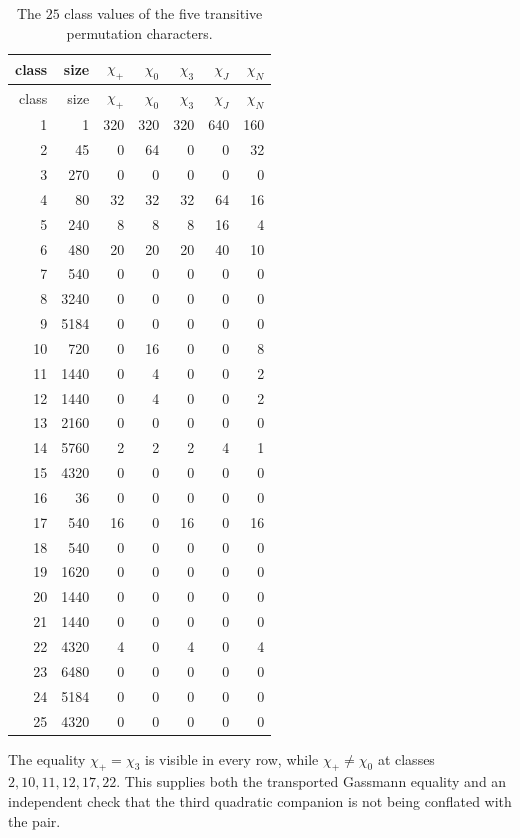 \begin{longtable}{@{}rrrrrrr@{}}
\caption{The $25$ class values of the five transitive permutation
characters.}
\label{tab:character-vectors}\\
\toprule
class & size & $\chi_+$ & $\chi_0$ & $\chi_3$ & $\chi_J$ & $\chi_N$\\
\midrule
\endfirsthead
\toprule
class & size & $\chi_+$ & $\chi_0$ & $\chi_3$ & $\chi_J$ & $\chi_N$\\
\midrule
\endhead
1  & 1    & 320 & 320 & 320 & 640 & 160\\
2  & 45   & 0   & 64  & 0   & 0   & 32\\
3  & 270  & 0   & 0   & 0   & 0   & 0\\
4  & 80   & 32  & 32  & 32  & 64  & 16\\
5  & 240  & 8   & 8   & 8   & 16  & 4\\
6  & 480  & 20  & 20  & 20  & 40  & 10\\
7  & 540  & 0   & 0   & 0   & 0   & 0\\
8  & 3240 & 0   & 0   & 0   & 0   & 0\\
9  & 5184 & 0   & 0   & 0   & 0   & 0\\
10 & 720  & 0   & 16  & 0   & 0   & 8\\
11 & 1440 & 0   & 4   & 0   & 0   & 2\\
12 & 1440 & 0   & 4   & 0   & 0   & 2\\
13 & 2160 & 0   & 0   & 0   & 0   & 0\\
14 & 5760 & 2   & 2   & 2   & 4   & 1\\
15 & 4320 & 0   & 0   & 0   & 0   & 0\\
16 & 36   & 0   & 0   & 0   & 0   & 0\\
17 & 540  & 16  & 0   & 16  & 0   & 16\\
18 & 540  & 0   & 0   & 0   & 0   & 0\\
19 & 1620 & 0   & 0   & 0   & 0   & 0\\
20 & 1440 & 0   & 0   & 0   & 0   & 0\\
21 & 1440 & 0   & 0   & 0   & 0   & 0\\
22 & 4320 & 4   & 0   & 4   & 0   & 4\\
23 & 6480 & 0   & 0   & 0   & 0   & 0\\
24 & 5184 & 0   & 0   & 0   & 0   & 0\\
25 & 4320 & 0   & 0   & 0   & 0   & 0\\
\bottomrule
\end{longtable}
The equality $\chi_+=\chi_3$ is visible in every row, while
$\chi_+\ne\chi_0$ at classes $2,10,11,12,17,22$.  This supplies both the
transported Gassmann equality and an independent check that the third
quadratic companion is not being conflated with the pair.
